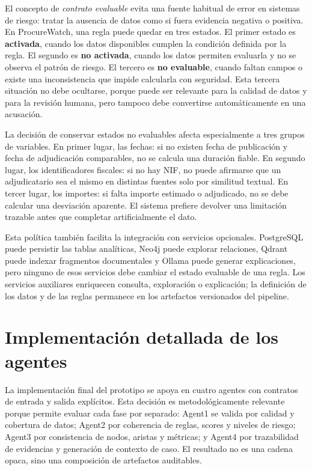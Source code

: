 \documentclass[11pt,a4paper,spanish]{book}
\numberwithin{equation}{chapter}
\numberwithin{figure}{chapter}
\begin{document}
El concepto de \textit{contrato evaluable} evita una fuente habitual de error en sistemas de riesgo:
tratar la ausencia de datos como si fuera evidencia negativa o positiva. En ProcureWatch, una regla
puede quedar en tres estados. El primer estado es \textbf{activada}, cuando los datos disponibles
cumplen la condici{\'o}n definida por la regla. El segundo es \textbf{no activada}, cuando los datos
permiten evaluarla y no se observa el patr{\'o}n de riesgo. El tercero es \textbf{no evaluable}, cuando
faltan campos o existe una inconsistencia que impide calcularla con seguridad. Esta tercera situaci{\'o}n
no debe ocultarse, porque puede ser relevante para la calidad de datos y para la revisi{\'o}n humana,
pero tampoco debe convertirse autom{\'a}ticamente en una acusaci{\'o}n.

La decisi{\'o}n de conservar estados no evaluables afecta especialmente a tres grupos de variables.
En primer lugar, las fechas: si no existen fecha de publicaci{\'o}n y fecha de adjudicaci{\'o}n
comparables, no se calcula una duraci{\'o}n fiable. En segundo lugar, los identificadores fiscales:
si no hay NIF, no puede afirmarse que un adjudicatario sea el mismo en distintas fuentes solo por
similitud textual. En tercer lugar, los importes: si falta importe estimado o adjudicado, no se debe
calcular una desviaci{\'o}n aparente. El sistema prefiere devolver una limitaci{\'o}n trazable antes
que completar artificialmente el dato.

Esta pol{\'i}tica tambi{\'e}n facilita la integraci{\'o}n con servicios opcionales. PostgreSQL puede
persistir las tablas anal{\'i}ticas, Neo4j puede explorar relaciones, Qdrant puede indexar fragmentos
documentales y Ollama puede generar explicaciones, pero ninguno de esos servicios debe cambiar el
estado evaluable de una regla. Los servicios auxiliares enriquecen consulta, exploraci{\'o}n o
explicaci{\'o}n; la definici{\'o}n de los datos y de las reglas permanece en los artefactos versionados
del pipeline.

\section{Implementaci{\'o}n detallada de los agentes}
\label{sec:implementacion_detallada_agentes}

La implementaci{\'o}n final del prototipo se apoya en cuatro agentes con contratos de entrada y salida
expl{\'i}citos. Esta decisi{\'o}n es metodol{\'o}gicamente relevante porque permite evaluar cada fase por
separado: Agent1 se valida por calidad y cobertura de datos; Agent2 por coherencia de reglas,
scores y niveles de riesgo; Agent3 por consistencia de nodos, aristas y m{\'e}tricas; y Agent4 por
trazabilidad de evidencias y generaci{\'o}n de contexto de caso. El resultado no es una cadena opaca,
sino una composici{\'o}n de artefactos auditables.
\end{document}
